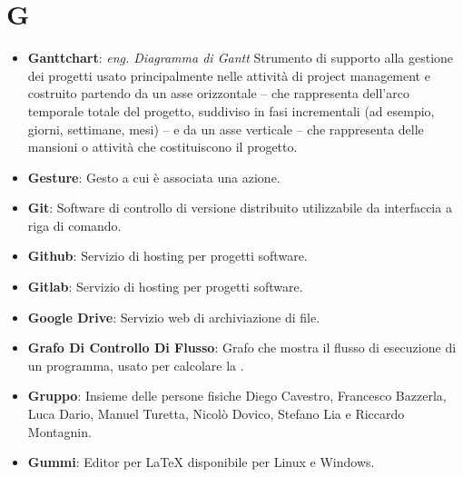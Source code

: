 \section*{G}
\begin{itemize}
	\item
	\textbf{Ganttchart}: \textit{eng. Diagramma di Gantt} Strumento di supporto alla gestione dei progetti usato principalmente nelle attività di project management e costruito partendo da un asse orizzontale -- che rappresenta dell'arco temporale totale del progetto, suddiviso in fasi incrementali (ad esempio, giorni, settimane, mesi) -- e da un asse verticale -- che rappresenta delle mansioni o attività che costituiscono il progetto.
	\item
	\textbf{Gesture}: Gesto a cui è associata una azione.
	\item
	\textbf{Git}: Software di controllo di versione distribuito utilizzabile da interfaccia a riga di comando.
	\item
	\textbf{Github}: Servizio di hosting per progetti software.
	\item
	\textbf{Gitlab}: Servizio di hosting per progetti software.
	\item
	\textbf{Google Drive}: Servizio web di archiviazione di file.
	\item
	\textbf{Grafo Di Controllo Di Flusso}: Grafo che mostra il flusso di esecuzione di un programma, usato per calcolare la .
	\item
	\textbf{Gruppo}: Insieme delle persone fisiche Diego Cavestro, Francesco Bazzerla, Luca Dario, Manuel Turetta, Nicolò Dovico, Stefano Lia e Riccardo Montagnin.
	\item
	\textbf{Gummi}: Editor per LaTeX disponibile per Linux e Windows.
\end{itemize}
\newpage